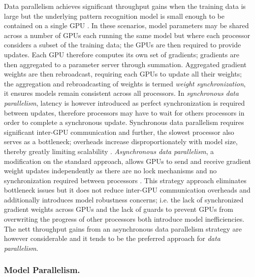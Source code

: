 \documentclass[10pt]{article}[draft]
\begin{document}
 Data parallelism achieves significant throughput gains  when the training data is large but the underlying pattern recognition model is small enough to be contained on a single GPU \cite{(Krizhevsky, 2014)}. In these scenarios, model parameters may be shared across a number of  GPUs each running the same model but where each processor considers a subset of the training data; the GPUs are then required to provide updates. Each GPU therefore computes  its own set of gradients;  gradients are then aggregated to a parameter server through summation.  Aggregated gradient weights are  then rebroadcast, requiring each GPUs to update all their weights; the aggregation and rebroadcasting of weights is termed \emph{weight synchronization}, it ensures models remain consistent across all processors.  In \emph{synchronous data parallelism}, latency is however introduced as  perfect synchronization is required between updates, therefore processors may  have to wait for others processors in order to complete a synchronous  update. Synchronous data parallelism requires significant inter-GPU communication and further, the slowest processor also serves as a bottleneck;  overheads increase disproportionately with model size, thereby greatly limiting scalability \cite{(Seide et al., 2014; Strom, 2015; Alistarh et al., 2016; Zhou et al., 2016; Aji & Heafield, 2017; Lin et al., 2017}.  \emph{Asynchronous data parallelism}, a modification on the standard approach, allows GPUs to send and receive gradient weight updates independently as there are no lock mechanisms and no synchronization required between processors \cite{J. Dean et al. Large scale distributed deep networks. NIPS Conference, 2012}. This strategy approach eliminates bottleneck issues but it does not reduce inter-GPU communication overheads and additionally introduces model robustness concerns; i.e. the lack of synchronized gradient weights across GPUs and the lack of guards to prevent GPUs from overwriting the progress of other processors  both introduce model inefficiencies. The nett throughput gains from an asynchronous data parallelism strategy are however considerable and it tends to be the preferred approach for \emph{data parallelism}.
 
 \subsubsection{Model Parallelism.}
 
\end{document}
